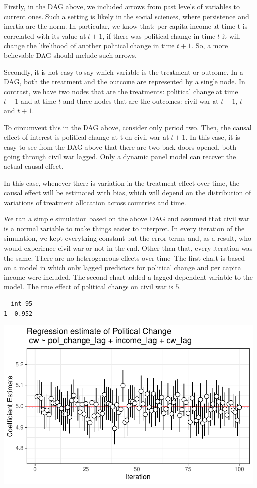 \documentclass[
  super,
  preprint,
  3p]{elsarticle}
\begin{document}
Firstly, in the DAG above, we included arrows from past levels of
variables to current ones. Such a setting is likely in the social
sciences, where persistence and inertia are the norm. In particular, we
know that: per capita income at time t is correlated with its value at
\(t +1\), if there was political change in time \(t\) it will change the
likelihood of another political change in time \(t + 1\). So, a more
believable DAG should include such arrows.

Secondly, it is not easy to say which variable is the treatment or
outcome. In a DAG, both the treatment and the outcome are represented by
a single node. In contrast, we have two nodes that are the treatments:
political change at time \(t -1\) and at time \(t\) and three nodes that
are the outcomes: civil war at \(t -1\), \(t\) and \(t +1\).

To circumvent this in the DAG above, consider only period two. Then, the
causal effect of interest is political change at t on civil war at
\(t +1\). In this case, it is easy to see from the DAG above that there
are two back-doors opened, both going through civil war lagged. Only a
dynamic panel model can recover the actual causal effect.

In this case, whenever there is variation in the treatment effect over
time, the causal effect will be estimated with bias, which will depend
on the distribution of variations of treatment allocation across
countries and time.

We ran a simple simulation based on the above DAG and assumed that civil
war is a normal variable to make things easier to interpret. In every
iteration of the simulation, we kept everything constant but the error
terms and, as a result, who would experience civil war or not in the
end. Other than that, every iteration was the same. There are no
heterogeneous effects over time. The first chart is based on a model in
which only lagged predictors for political change and per capita income
were included. The second chart added a lagged dependent variable to the
model. The true effect of political change on civil war is \(5\).

\begin{verbatim}
  int_95
1  0.952
\end{verbatim}

\includegraphics{Papers_beware_collider_files/figure-pdf/simulation 1-1.pdf}
\end{document}
